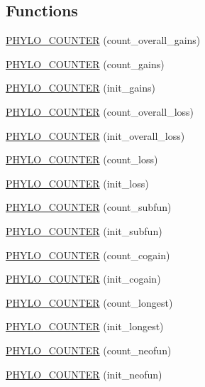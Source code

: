 \subsection*{Functions}
\begin{DoxyCompactItemize}
\item 
\hyperlink{namespacebarry_1_1counters_1_1phylo_aff5bb18e1e512766165db69a49aa5faf}{P\+H\+Y\+L\+O\+\_\+\+C\+O\+U\+N\+T\+ER} (count\+\_\+overall\+\_\+gains)
\item 
\hyperlink{namespacebarry_1_1counters_1_1phylo_a05016e4206f7119fe2750fe635fd5d9e}{P\+H\+Y\+L\+O\+\_\+\+C\+O\+U\+N\+T\+ER} (count\+\_\+gains)
\item 
\hyperlink{namespacebarry_1_1counters_1_1phylo_ab8fa2f7821ceb10802cebe0978b16a9e}{P\+H\+Y\+L\+O\+\_\+\+C\+O\+U\+N\+T\+ER} (init\+\_\+gains)
\item 
\hyperlink{namespacebarry_1_1counters_1_1phylo_a221360f9f38e0533053e9b841e47af05}{P\+H\+Y\+L\+O\+\_\+\+C\+O\+U\+N\+T\+ER} (count\+\_\+overall\+\_\+loss)
\item 
\hyperlink{namespacebarry_1_1counters_1_1phylo_a0e06390620b292d2af11f242b42be8d3}{P\+H\+Y\+L\+O\+\_\+\+C\+O\+U\+N\+T\+ER} (init\+\_\+overall\+\_\+loss)
\item 
\hyperlink{namespacebarry_1_1counters_1_1phylo_adb64adc4b5d8c51d7b487080575b82fe}{P\+H\+Y\+L\+O\+\_\+\+C\+O\+U\+N\+T\+ER} (count\+\_\+loss)
\item 
\hyperlink{namespacebarry_1_1counters_1_1phylo_a6f08ac44d27135b3024cf05cee645cab}{P\+H\+Y\+L\+O\+\_\+\+C\+O\+U\+N\+T\+ER} (init\+\_\+loss)
\item 
\hyperlink{namespacebarry_1_1counters_1_1phylo_a5e16549d061fe504ff179cce13cb3c75}{P\+H\+Y\+L\+O\+\_\+\+C\+O\+U\+N\+T\+ER} (count\+\_\+subfun)
\item 
\hyperlink{namespacebarry_1_1counters_1_1phylo_a6719ed3dce4ad7d265ef30c763a2922f}{P\+H\+Y\+L\+O\+\_\+\+C\+O\+U\+N\+T\+ER} (init\+\_\+subfun)
\item 
\hyperlink{namespacebarry_1_1counters_1_1phylo_ae63e464a69b55f96310beff8efbdab16}{P\+H\+Y\+L\+O\+\_\+\+C\+O\+U\+N\+T\+ER} (count\+\_\+cogain)
\item 
\hyperlink{namespacebarry_1_1counters_1_1phylo_a78ce78c8bd2aff03f9e466a94b98419b}{P\+H\+Y\+L\+O\+\_\+\+C\+O\+U\+N\+T\+ER} (init\+\_\+cogain)
\item 
\hyperlink{namespacebarry_1_1counters_1_1phylo_a315b1475914060a311844505634c0e55}{P\+H\+Y\+L\+O\+\_\+\+C\+O\+U\+N\+T\+ER} (count\+\_\+longest)
\item 
\hyperlink{namespacebarry_1_1counters_1_1phylo_a36b4c845e294f47ef902d1b32c586036}{P\+H\+Y\+L\+O\+\_\+\+C\+O\+U\+N\+T\+ER} (init\+\_\+longest)
\item 
\hyperlink{namespacebarry_1_1counters_1_1phylo_a61a2efcc99186d3182fd425c08ea8e01}{P\+H\+Y\+L\+O\+\_\+\+C\+O\+U\+N\+T\+ER} (count\+\_\+neofun)
\item 
\hyperlink{namespacebarry_1_1counters_1_1phylo_aa0fef3ad5de8d0661e033c87986a7b95}{P\+H\+Y\+L\+O\+\_\+\+C\+O\+U\+N\+T\+ER} (init\+\_\+neofun)
\end{DoxyCompactItemize}
